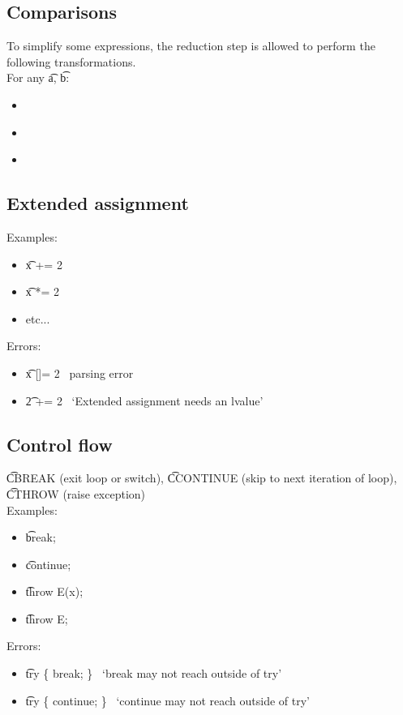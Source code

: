 \subsection{Comparisons}
To simplify some expressions, the reduction step is allowed to perform the following transformations.\\
For any \t{a}, \t{b}:
\begin{itemize}
    \item {} \to\ 
    \item {} \to\ 
    \item {} \to\ 
\end{itemize}

\subsection{Extended assignment}
Examples:
\begin{itemize}
    \item \t{x += 2} \to\ 
    \item \t{x *= 2} \to\ 
    \item etc...
\end{itemize}
Errors:
\begin{itemize}
    \item \t{x []= 2} \to\ parsing error
    \item \t{2 += 2} \to\ `Extended assignment needs an lvalue'
\end{itemize}

\subsection{Control flow}
\t{CBREAK} (exit loop or switch), \t{CCONTINUE} (skip to next iteration of loop), \t{CTHROW} (raise exception)\\
Examples:
\begin{itemize}
    \item \t{break;} \to\ 
    \item \t{continue;} \to\ 
    \item \t{throw E(x);} \to\ 
    \item \t{throw E;} \to\ 
\end{itemize}
Errors:
\begin{itemize}
    \item \t{try \{ break; \}} \to\ `break may not reach outside of try'
    \item \t{try \{ continue; \}} \to\ `continue may not reach outside of try'
\end{itemize}

